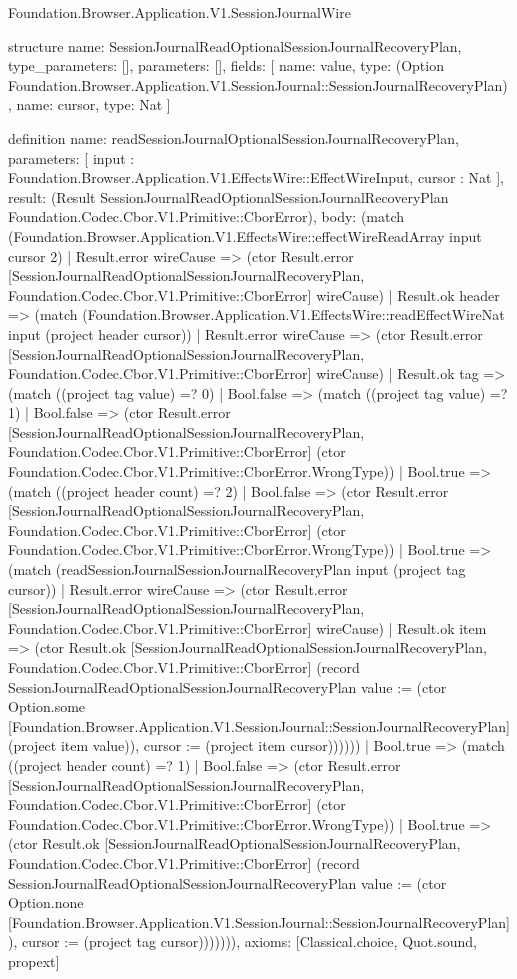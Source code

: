 \begin{lexlean}{Foundation.Browser.Application.V1.SessionJournalWire}
\begin{semanticmodule}
structure{
  name: SessionJournalReadOptionalSessionJournalRecoveryPlan,
  type_parameters: [],
  parameters: [],
  fields: [
    {
      name: value,
      type: (Option Foundation.Browser.Application.V1.SessionJournal::SessionJournalRecoveryPlan)
    },
    {name: cursor, type: Nat}
  ]
}

definition{
  name: readSessionJournalOptionalSessionJournalRecoveryPlan,
  parameters: [
    input : Foundation.Browser.Application.V1.EffectsWire::EffectWireInput,
    cursor : Nat
  ],
  result: (Result SessionJournalReadOptionalSessionJournalRecoveryPlan Foundation.Codec.Cbor.V1.Primitive::CborError),
  body: (match (Foundation.Browser.Application.V1.EffectsWire::effectWireReadArray input cursor 2)
    | Result.error wireCause => (ctor Result.error [SessionJournalReadOptionalSessionJournalRecoveryPlan, Foundation.Codec.Cbor.V1.Primitive::CborError] wireCause)
    | Result.ok header => (match (Foundation.Browser.Application.V1.EffectsWire::readEffectWireNat input (project header cursor))
      | Result.error wireCause => (ctor Result.error [SessionJournalReadOptionalSessionJournalRecoveryPlan, Foundation.Codec.Cbor.V1.Primitive::CborError] wireCause)
      | Result.ok tag => (match ((project tag value) =? 0)
        | Bool.false => (match ((project tag value) =? 1)
          | Bool.false => (ctor Result.error [SessionJournalReadOptionalSessionJournalRecoveryPlan, Foundation.Codec.Cbor.V1.Primitive::CborError] (ctor Foundation.Codec.Cbor.V1.Primitive::CborError.WrongType))
          | Bool.true => (match ((project header count) =? 2)
            | Bool.false => (ctor Result.error [SessionJournalReadOptionalSessionJournalRecoveryPlan, Foundation.Codec.Cbor.V1.Primitive::CborError] (ctor Foundation.Codec.Cbor.V1.Primitive::CborError.WrongType))
            | Bool.true => (match (readSessionJournalSessionJournalRecoveryPlan input (project tag cursor))
              | Result.error wireCause => (ctor Result.error [SessionJournalReadOptionalSessionJournalRecoveryPlan, Foundation.Codec.Cbor.V1.Primitive::CborError] wireCause)
              | Result.ok item => (ctor Result.ok [SessionJournalReadOptionalSessionJournalRecoveryPlan, Foundation.Codec.Cbor.V1.Primitive::CborError] (record SessionJournalReadOptionalSessionJournalRecoveryPlan {value := (ctor Option.some [Foundation.Browser.Application.V1.SessionJournal::SessionJournalRecoveryPlan] (project item value)), cursor := (project item cursor)})))))
        | Bool.true => (match ((project header count) =? 1)
          | Bool.false => (ctor Result.error [SessionJournalReadOptionalSessionJournalRecoveryPlan, Foundation.Codec.Cbor.V1.Primitive::CborError] (ctor Foundation.Codec.Cbor.V1.Primitive::CborError.WrongType))
          | Bool.true => (ctor Result.ok [SessionJournalReadOptionalSessionJournalRecoveryPlan, Foundation.Codec.Cbor.V1.Primitive::CborError] (record SessionJournalReadOptionalSessionJournalRecoveryPlan {value := (ctor Option.none [Foundation.Browser.Application.V1.SessionJournal::SessionJournalRecoveryPlan]), cursor := (project tag cursor)})))))),
  axioms: [Classical.choice, Quot.sound, propext]
}


\end{semanticmodule}
\end{lexlean}
